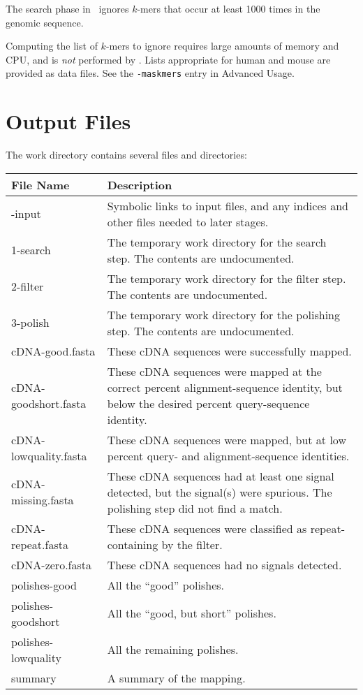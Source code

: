\documentclass[twoside,11pt]{book}
\begin{document}
The search phase in \ESTmapper\ ignores $k$-mers that occur at least
1000 times in the genomic sequence.

Computing the list of $k$-mers to ignore requires large amounts of
memory and CPU, and is {\em not} performed by \ESTmapper. Lists
appropriate for human and mouse are provided as data files.  See the
{\tt -maskmers} entry in Advanced Usage.

\chapter{Output Files}
\label{chap:output}

The work directory contains several files and directories:

\setlongtables
\begin{longtable}{|l|p{3.4in}|}
\hline
File Name & Description \\
\hline
\hline
\endhead
\hline
\endfoot
0-input               & Symbolic links to input files, and any indices and other files needed to later stages. \\
\hline
1-search              & The temporary work directory for the search step.  The contents are undocumented. \\
\hline
2-filter              & The temporary work directory for the filter step.  The contents are undocumented.\\
\hline
3-polish              & The temporary work directory for the polishing step.  The contents are undocumented.\\
\hline
cDNA-good.fasta       & These cDNA sequences were successfully mapped.\\
\hline
cDNA-goodshort.fasta  & These cDNA sequences were mapped at the correct percent alignment-sequence identity, but below the desired percent query-sequence identity.\\
\hline
cDNA-lowquality.fasta & These cDNA sequences were mapped, but at low percent query- and alignment-sequence identities.\\
\hline
cDNA-missing.fasta    & These cDNA sequences had at least one signal detected, but the signal(s) were spurious.  The polishing step did not find a match.\\
\hline
cDNA-repeat.fasta     & These cDNA sequences were classified as repeat-containing by the filter.\\
\hline
cDNA-zero.fasta       & These cDNA sequences had no signals detected.\\
\hline
polishes-good         & All the ``good'' polishes.\\
\hline
polishes-goodshort    & All the ``good, but short'' polishes.\\
\hline
polishes-lowquality   & All the remaining polishes.\\
\hline
summary               & A summary of the mapping.\\
\end{longtable}
\end{document}
